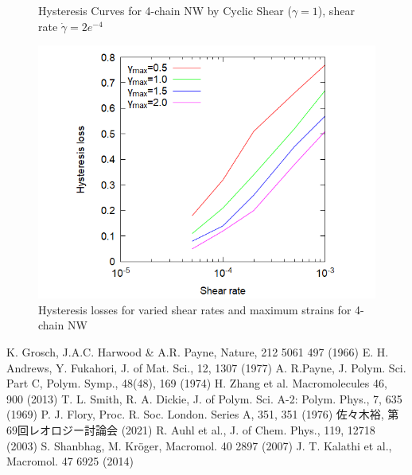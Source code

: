\documentclass[uplatex,dvipdfmx,a4paper,11pt]{jsarticle}
\begin{document}
\begin{figure}[hb]
\begin{minipage}{0.33\hsize}
\begin{center}
        \caption{Hysteresis Curves for 4-chain NW by Cyclic Shear ($\gamma = 1$), shear rate $\dot{\gamma} = 2e^{-4}$}
        \label{fig:hyst}
	\end{center}
\end{minipage}
\begin{minipage}{0.33\hsize}
	\begin{center}
        \includegraphics[width=.9\textwidth]{hyst_shear.png}
        \caption{Hysteresis losses for varied shear rates and maximum strains for 4-chain NW}
        \label{fig:hystloss}
	\end{center}
\end{minipage}
\end{figure}

\vspace{-7mm}
\begin{thebibliography}{99}
     K. Grosch, J.A.C. Harwood \& A.R. Payne, Nature, 212 5061 497 (1966)
     E. H. Andrews, Y. Fukahori, J. of Mat. Sci., 12, 1307 (1977)
     A. R.Payne, J. Polym. Sci. Part C, Polym. Symp., 48(48), 169 (1974)
     H. Zhang et al. Macromolecules 46, 900 (2013)
     T. L. Smith, R. A. Dickie, J. of Polym. Sci. A-2: Polym. Phys., 7, 635 (1969)
     P. J. Flory, Proc. R. Soc. London. Series A, 351, 351 (1976)
     佐々木裕, 第69回レオロジー討論会 (2021)
     R. Auhl et al., J. of Chem. Phys., 119, 12718 (2003)
     S. Shanbhag, M. Kr\"{o}ger, Macromol. 40 2897 (2007)
     J. T. Kalathi et al., Macromol. 47 6925 (2014)
\end{thebibliography}
\end{document}

